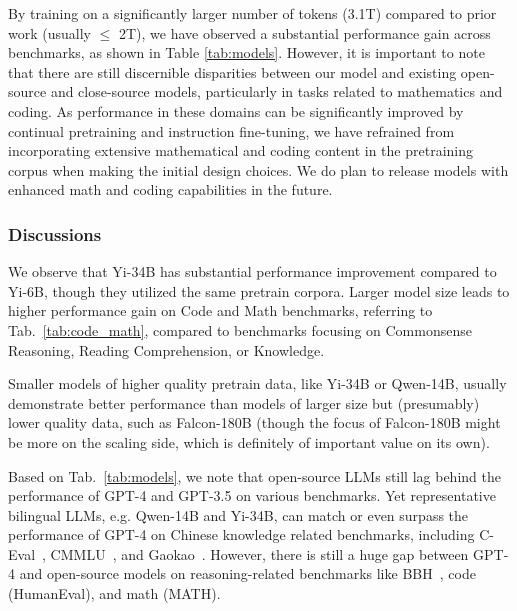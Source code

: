 


By training on a significantly larger number of tokens (3.1T) compared to prior work (usually $\le$ 2T), we have observed a substantial performance gain across  benchmarks, as shown in Table \ref{tab:models}. However, it is important to note that there are still discernible disparities between our model and existing open-source and close-source models, particularly in tasks related to mathematics and coding. As performance in these domains can be significantly improved by continual pretraining and instruction fine-tuning, we have refrained from incorporating extensive mathematical and coding content in the pretraining corpus when making the initial design choices. We do plan to release models with enhanced math and coding capabilities in the future.






\subsubsection{Discussions}

\begin{description}[leftmargin=0.2in]
\item[Gain from Model Scale.] We observe that Yi-34B has substantial performance improvement compared to Yi-6B, though they utilized the same pretrain corpora.
Larger model size leads to higher performance gain on Code and Math benchmarks, referring to Tab.~\ref{tab:code_math}, compared to benchmarks focusing on Commonsense Reasoning, Reading Comprehension, or Knowledge.
\item[Data Quality.]
Smaller models of higher quality pretrain data, like Yi-34B or Qwen-14B, usually demonstrate better performance than models of larger size but (presumably) lower quality data, such as Falcon-180B (though the focus of Falcon-180B might be more on the scaling side, which is definitely of important value on its own). 
\item[Gap between GPT-4 and Open-source LLMs.]
Based on Tab.~\ref{tab:models}, we note that open-source LLMs still lag behind the performance of GPT-4 and GPT-3.5 on various benchmarks.
Yet representative bilingual LLMs, e.g. Qwen-14B and Yi-34B, can match or even surpass the performance of GPT-4 on Chinese knowledge related benchmarks, including C-Eval~\cite{huang2023c}, CMMLU~\cite{li2023cmmlu}, and Gaokao~\cite{zhang2023evaluating}.
However, there is still a huge gap between GPT-4 and open-source models on reasoning-related benchmarks like BBH~\cite{srivastava2023imitation}, code (HumanEval), and math (MATH).
\end{description}


